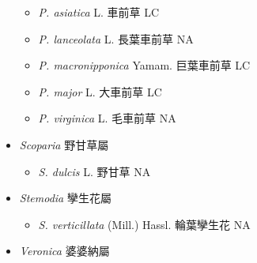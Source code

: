 \begin{itemize}
  \begin{itemize}
        \item[] \textit{P. asiatica} L.  車前草   LC
        \item[] \textit{P. lanceolata} L.  長葉車前草   NA
        \item[] \textit{P. macronipponica} Yamam.  巨葉車前草   LC
        \item[] \textit{P. major} L.  大車前草   LC
        \item[] \textit{P. virginica} L.  毛車前草   NA
  \end{itemize}
 \item[] \textit{Scoparia} 野甘草屬
                                
  \begin{itemize}
        \item[] \textit{S. dulcis} L.  野甘草   NA
  \end{itemize}
 \item[] \textit{Stemodia} 孿生花屬
                                
  \begin{itemize}
        \item[] \textit{S. verticillata} (Mill.) Hassl.  輪葉孿生花   NA
  \end{itemize}
 \item[] \textit{Veronica} 婆婆納屬
                                

\end{itemize}
